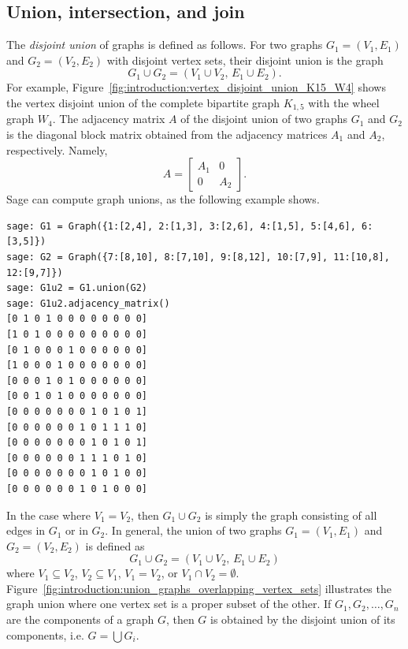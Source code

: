 
\subsection{Union, intersection, and join}

The \emph{disjoint union} of graphs is defined as follows. For two
graphs $G_1 = (V_1, E_1)$ and $G_2 = (V_2, E_2)$ with disjoint vertex
sets, their disjoint union is the graph
\[
G_1 \cup G_2
=
(V_1 \cup V_2,\, E_1 \cup E_2).
\]
For example,
Figure~\ref{fig:introduction:vertex_disjoint_union_K15_W4} shows the
vertex disjoint union of the complete bipartite graph $K_{1,5}$ with
the wheel graph $W_4$. The adjacency matrix $A$ of the disjoint union
of two graphs $G_1$ and $G_2$ is the diagonal block matrix obtained
from the adjacency matrices $A_1$ and $A_2$, respectively. Namely,
\[
A
=
\begin{bmatrix}
A_1 & 0 \\
0 & A_2
\end{bmatrix}.
\]
%
Sage can compute graph unions, as the following example shows.
%
\begin{lstlisting}
sage: G1 = Graph({1:[2,4], 2:[1,3], 3:[2,6], 4:[1,5], 5:[4,6], 6:[3,5]})
sage: G2 = Graph({7:[8,10], 8:[7,10], 9:[8,12], 10:[7,9], 11:[10,8], 12:[9,7]})
sage: G1u2 = G1.union(G2)
sage: G1u2.adjacency_matrix()
[0 1 0 1 0 0 0 0 0 0 0 0]
[1 0 1 0 0 0 0 0 0 0 0 0]
[0 1 0 0 0 1 0 0 0 0 0 0]
[1 0 0 0 1 0 0 0 0 0 0 0]
[0 0 0 1 0 1 0 0 0 0 0 0]
[0 0 1 0 1 0 0 0 0 0 0 0]
[0 0 0 0 0 0 0 1 0 1 0 1]
[0 0 0 0 0 0 1 0 1 1 1 0]
[0 0 0 0 0 0 0 1 0 1 0 1]
[0 0 0 0 0 0 1 1 1 0 1 0]
[0 0 0 0 0 0 0 1 0 1 0 0]
[0 0 0 0 0 0 1 0 1 0 0 0]
\end{lstlisting}
%
In the case where $V_1 = V_2$, then $G_1 \cup G_2$ is simply the graph
consisting of all edges in $G_1$ or in $G_2$. In general, the union of
two graphs $G_1 = (V_1, E_1)$ and $G_2 = (V_2, E_2)$ is defined as
\[
G_1 \cup G_2
=
(V_1 \cup V_2,\, E_1 \cup E_2)
\]
where $V_1 \subseteq V_2$, $V_2 \subseteq V_1$, $V_1 = V_2$, or
$V_1 \cap V_2 = \emptyset$.
Figure~\ref{fig:introduction:union_graphs_overlapping_vertex_sets}
illustrates the graph union where one vertex set is a proper subset of
the other. If $G_1, G_2, \dots, G_n$ are the components of a graph
$G$, then $G$ is obtained by the disjoint union of its
components, i.e. $G = \bigcup G_i$.

